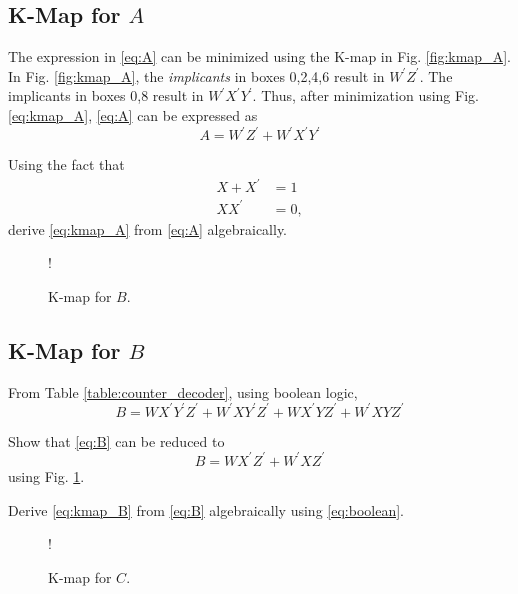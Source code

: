 \documentclass[journal,12pt,twocolumn]{IEEEtran}
\begin{document}
\subsection{K-Map for $A$ }
The expression in \eqref{eq:A}  can be minimized using the K-map in Fig. \ref{fig:kmap_A}.
In Fig. \ref{fig:kmap_A},  the {\em implicants} in boxes 0,2,4,6 result in $W^{\prime}Z^{\prime}$.  The implicants in
boxes 0,8 result in $W^{\prime}X^{\prime}Y^{\prime}$.  Thus, after minimization using Fig. \ref{eq:kmap_A},  \eqref{eq:A} can be expressed as
%
\begin{equation}
\label{eq:kmap_A}
A = W^{\prime}Z^{\prime}+W^{\prime}X^{\prime}Y^{\prime}
\end{equation}
%
\begin{problem}
Using the fact that
\begin{align}
\label{eq:boolean}
X+X^{\prime} &= 1
\\
XX^{\prime} &= 0,
\end{align}
%
derive \eqref{eq:kmap_A} from \eqref{eq:A} algebraically.
\end{problem}
%
%
\begin{figure}[!h]
\resizebox {\columnwidth} {!} {

}
\caption{K-map for $B$.}
\label{fig:kmap_B}
\end{figure}

\subsection{K-Map for $B$ }
From Table \ref{table:counter_decoder}, using boolean logic,
\begin{equation}
\label{eq:B}
B = WX^{\prime}Y^{\prime}Z^{\prime} + W^{\prime}XY^{\prime}Z^{\prime}
+WX^{\prime}YZ^{\prime}
+W^{\prime}XYZ^{\prime}
\end{equation}
%
\begin{problem}
Show that \eqref{eq:B} can be reduced to
\begin{equation}
\label{eq:kmap_B}
B = WX^{\prime}Z^{\prime} + W^{\prime}XZ^{\prime}
\end{equation}
using Fig. \ref{fig:kmap_B}.
\end{problem}
\begin{problem}
Derive \eqref{eq:kmap_B} from \eqref{eq:B} algebraically using \eqref{eq:boolean}.
\end{problem}
%
\begin{figure}[!h]
\resizebox {\columnwidth} {!} {

}
\caption{K-map for $C$.}
\label{fig:kmap_C}
\end{figure}
\end{document}
